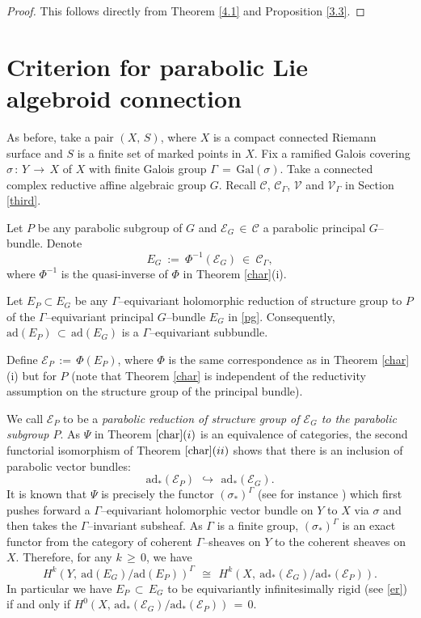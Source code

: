\documentclass[12pt, reqno]{amsart}
\numberwithin{equation}{section}
\newcommand{\ad}{\textrm{ad}}
\newcommand{\Gal}{\textrm{Gal}}
\begin{document}
\begin{proof}
This follows directly from Theorem \ref{4.1} and Proposition \ref{3.3}.
\end{proof}

\section{Criterion for parabolic Lie algebroid connection}

As before, take a pair $(X,\,S)$, where $X$ is a compact connected Riemann surface and $S$ is a finite set of marked 
points in $X$. Fix a ramified Galois covering $\sigma\,:\,Y\,\longrightarrow\, X$ of $X$ with finite Galois group 
$\Gamma\,=\,\Gal(\sigma)$. Take a connected complex reductive affine algebraic group $G$. Recall
$\mathscr{C}$, $\mathscr{C}_{\Gamma}$, $\mathscr{V}$ and $\mathscr{V}_{\Gamma}$ in Section \ref{third}.

Let $P$ be any parabolic subgroup of $G$ and $\mathcal{E}_{G}\,\in\,\mathscr{C}$ a parabolic principal 
$G$--bundle. Denote
\begin{equation}\label{pg}
E_{G}\ :=\ \Phi^{-1}(\mathcal{E}_{G})\ \in\ \mathscr{C}_{\Gamma},
\end{equation}
where $\Phi^{-1}$ is the quasi-inverse of $\Phi$ in Theorem \ref{char}(i).

Let $E_{P}\subset E_{G}$ be any $\Gamma$--equivariant holomorphic reduction of structure group to $P$
of the $\Gamma$--equivariant principal $G$--bundle $E_{G}$ in \eqref{pg}. Consequently,
$\ad(E_{P})\,\subset\, \ad(E_{G})$ is a $\Gamma$--equivariant subbundle.

Define $\mathcal{E}_{P}\,:=\, \Phi(E_{P})$, where $\Phi$ is the same correspondence as in
Theorem \ref{char}(i) but for $P$ (note that Theorem \ref{char} is independent of the reductivity
assumption on the structure group of the principal bundle).

We call $\mathcal{E}_{P}$ to be a {\it parabolic reduction of structure group of $\mathcal{E}_{G}$ to the
parabolic subgroup $P$}. As $\Psi$ in Theorem $\ref{char}(i)$ is an equivalence of
categories, the second functorial isomorphism of Theorem $\ref{char}(ii)$ shows that there is an inclusion of parabolic vector bundles: 
 \[\ad_{*}(\mathcal{E}_{P})\,\ \hookrightarrow\,\ \ad_{*}(\mathcal{E}_{G}).\] 
It is known that $\Psi$ is precisely the functor $(\sigma_{*})^{\Gamma}$ (see for instance \cite{Bi3}) which
first pushes forward a $\Gamma$--equivariant holomorphic vector bundle on $Y$ to $X$ via $\sigma$ and then
takes the $\Gamma$--invariant subsheaf. As $\Gamma$ is a finite group, $(\sigma_{*})^{\Gamma}$ is an exact
functor from the category of coherent $\Gamma$--sheaves on $Y$ to the
coherent sheaves on $X$. Therefore, for any $k\,\geq\, 0$, we have
\begin{equation}\label{coh}
H^{k}(Y,\ \ad(E_{G})/\ad(E_{P}))^{\Gamma}\,\ \cong\,\ H^{k}(X,\
\ad_{*}(\mathcal{E}_{G})/\ad_{*}(\mathcal{E}_{P})).\end{equation}
In particular we have $E_{P}\,\subset\, E_{G}$ to be equivariantly infinitesimally rigid
(see \eqref{er}) if and only if $H^{0}(X,\,\ad_{*}(\mathcal{E}_{G})/\ad_{*}(\mathcal{E}_{P}))\,=\,0$.
\end{document}
